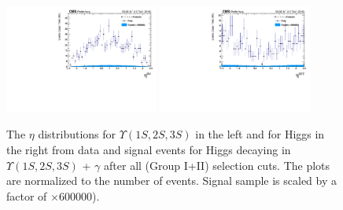 \begin{figure}[!htbp]
\begin{center}
\includegraphics[width=0.45\textwidth]{figures/outputPlots/HtoUpsilon_Cat0_ZZZZZ/nEvts/data_x_mc/withKinCuts/h_withKin_Upsilon_eta}\hspace*{1.cm}
\includegraphics[width=0.45\textwidth]{figures/outputPlots/HtoUpsilon_Cat0_ZZZZZ/nEvts/data_x_mc/withKinCuts/h_withKin_Z_eta}
\end{center}\vspace*{-.5cm}
\caption{The $\eta$ distributions for $\Upsilon(1S,2S,3S)$ in the left and for Higgs in the right from data and signal events for Higgs decaying in $\Upsilon(1S,2S,3S)$ + $\gamma$ after all (Group I+II) selection cuts. The plots are normalized to the number of events. Signal sample is scaled by a factor of $\times 600000$).}
\label{fig:etaUpsilon_and_Higgs_HtoUpsilon_Cat0_groupI_plus_II}
\end{figure}

